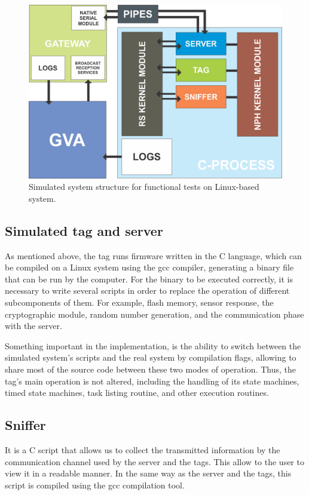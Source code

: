 \documentclass[journal]{IEEEtran}	%
\begin{document}
\begin{figure}[t!]
\centering
\includegraphics[width=0.95\columnwidth]{SIMULATED-SYSTEM.png}
\caption{Simulated system structure for functional tests on Linux-based system.}
\label{fig:simulated-system}
\end{figure}


\subsection{Simulated tag and server}


As mentioned above, the tag runs firmware written in the C language, which can be compiled on a Linux system using the gcc compiler, generating a binary file that can be run by the computer. For the binary to be executed correctly, it is necessary to write several scripts in order to replace the operation of different subcomponents of them. For example, flash memory, sensor response, the cryptographic module, random number generation, and the communication phase with the server.

Something important in the implementation, is the ability to switch between the simulated system's scripts and the real system by compilation flags, allowing to share most of the source code between these two modes of operation. Thus, the tag's main operation is not altered, including the handling of its state machines, timed state machines, task listing routine, and other execution routines.


\subsection{Sniffer}


It is a C script that allows us to collect the transmitted information by the communication channel used by the server and the tags. This allow to the user to view it in a readable manner. In the same way as the server and the tags, this script is compiled using the gcc compilation tool.
\end{document}
